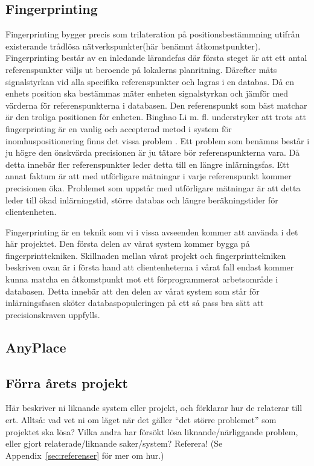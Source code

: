 \documentclass[a4paper,12pt]{article}
\begin{document}
\subsection{Fingerprinting}
Fingerprinting bygger precis som trilateration på positionsbestämmning utifrån existerande trådlösa nätverkspunkter(här benämnt åtkomstpunkter). Fingerprinting består av en inledande lärandefas där första steget är att ett antal referenspunkter väljs ut beroende på lokalerns planritning. Därefter mäts signalstyrkan vid alla specifika referenspunkter och lagras i en databas.%
Då en enhets position ska bestämmas mäter enheten signalstyrkan och jämför med värderna för referenspunkterna i databasen. Den referenspunkt som bäst matchar är den troliga positionen för enheten.\cite{IP1}\cite{jun2018low}
Binghao Li m. fl. understryker att trots att fingerprinting är en vanlig och accepterad metod i system för inomhuspositionering finns det vissa problem .\cite{IP1}
Ett problem som benämns består i ju högre den önskvärda precisionen är ju tätare bör referenspunkterna vara. Då detta innebär fler referenspunkter leder detta till en längre inlärningsfas. Ett annat faktum är att med utförligare mätningar i varje referenspunkt kommer precisionen öka. Problemet som uppstår med utförligare mätningar är att detta leder till ökad inlärningstid, större databas och längre beräkningstider för clientenheten.\cite{IP1}

Fingerprinting är en teknik som vi i vissa avseenden kommer att använda i det här projektet. Den första delen av vårat system kommer bygga på fingerprinttekniken. Skillnaden mellan vårat projekt och fingerprinttekniken beskriven ovan är i första hand att clientenheterna i vårat fall endast kommer kunna matcha en åtkomstpunkt mot ett förprogrammerat arbetsområde i databasen. Detta innebär att den delen av vårat system som står för inlärningsfasen sköter databaspopuleringen på ett så pass bra sätt att precisionskraven uppfylls.
\subsection{AnyPlace}

\subsection{Förra årets projekt}




Här beskriver ni liknande system eller projekt, och förklarar hur de relaterar till ert.  Alltså: vad vet ni om läget när det gäller ``det större problemet'' som projektet ska lösa?  Vilka andra har försökt lösa liknande/närliggande problem, eller gjort relaterade/liknande saker/system? Referera! (Se Appendix~\ref{sec:referenser} för mer om hur.)
\end{document}
